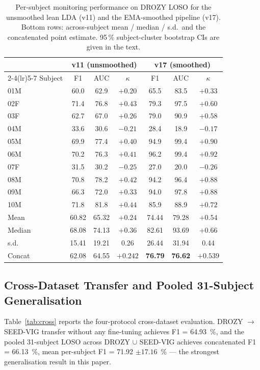 \documentclass[journal]{IEEEtran}
\DeclareRobustCommand{\add}[1]{#1}                         %
\DeclareRobustCommand{\del}[1]{}                           %
\DeclareRobustCommand{\add}[1]{\hl{#1}}
\DeclareRobustCommand{\del}[1]{{\color{delred}\sout{#1}}\,}
\DeclareRobustCommand{\del}[1]{}                         %
\DeclareRobustCommand{\chg}[2]{\del{#1}\add{#2}}
\begin{document}
\begin{table}[t]
\caption{Per-subject monitoring performance on DROZY LOSO for the unsmoothed lean LDA (v11) and the EMA-smoothed pipeline (v17). Bottom rows: across-subject mean / median / s.d.\ and the concatenated point estimate. 95\,\% subject-cluster bootstrap CIs are given in the text.}
\label{tab:persubj}
\centering
\small
\setlength{\tabcolsep}{3pt}
\begin{tabular}{l c c c c c c}
\toprule
 & \multicolumn{3}{c}{v11 (unsmoothed)} & \multicolumn{3}{c}{v17 (smoothed)} \\
\cmidrule(lr){2-4}\cmidrule(lr){5-7}
Subject & F1 & AUC & \(\kappa\) & F1 & AUC & \(\kappa\) \\
\midrule
01M & 60.0 & 62.9 & \(+0.20\) & 65.5 & 83.5 & \(+0.33\) \\
02F & 71.4 & 76.8 & \(+0.43\) & 79.3 & 97.5 & \(+0.60\) \\
03F & 62.7 & 67.0 & \(+0.26\) & 79.0 & 90.9 & \(+0.58\) \\
04M & 33.6 & 30.6 & \(-0.21\) & 28.4 & 18.9 & \(-0.17\) \\
05M & 69.9 & 77.4 & \(+0.40\) & 94.9 & 99.4 & \(+0.90\) \\
06M & 70.2 & 76.3 & \(+0.41\) & 96.2 & 99.4 & \(+0.92\) \\
07F & 31.5 & 30.2 & \(-0.25\) & 27.0 & 20.0 & \(-0.26\) \\
08M & 70.8 & 78.2 & \(+0.42\) & 94.2 & 96.4 & \(+0.88\) \\
09M & 66.3 & 72.0 & \(+0.33\) & 94.0 & 97.8 & \(+0.88\) \\
10M & 71.8 & 81.8 & \(+0.44\) & 85.9 & 88.9 & \(+0.72\) \\
\midrule
Mean   & 60.82 & 65.32 & \(+0.24\) & 74.44 & 79.28 & \(+0.54\) \\
Median & 68.08 & 74.13 & \(+0.36\) & 82.61 & 93.69 & \(+0.66\) \\
s.d.   & 15.41 & 19.21 & 0.26 & 26.44 & 31.94 & 0.44 \\
\midrule
Concat & 62.08 & 64.55 & \(+0.242\) & \textbf{76.79} & \textbf{76.62} & \(\mathbf{+0.539}\) \\
\bottomrule
\end{tabular}
\end{table}

\subsection{\chg{Cross-Dataset and Pooled LOSO}{Cross-Dataset Transfer and Pooled 31-Subject Generalisation}}
\label{sec:cross-dataset}
Table~\ref{tab:cross} reports the four-protocol cross-dataset evaluation. DROZY \(\to\) SEED-VIG transfer without any fine-tuning achieves F1 = 64.93~\%, and the pooled 31-subject LOSO across DROZY \(\cup\) SEED-VIG achieves concatenated F1 = 66.13~\%, mean per-subject F1 = 71.92 \(\pm 17.16\)~\% --- the strongest generalisation result in this paper.
\end{document}
